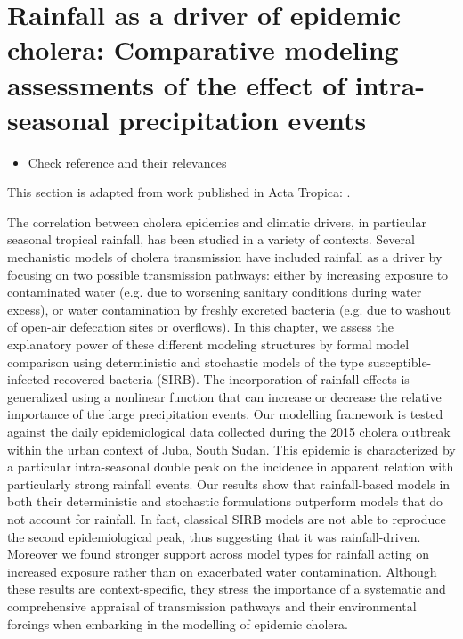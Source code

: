 \chapter{Rainfall as a driver of epidemic cholera: Comparative modeling assessments of the effect of intra-seasonal precipitation events}\label{ch:cholera-rainfall}

\begin{itemize}
	\item Check reference and their relevances
\end{itemize}

This section is adapted from work published in Acta Tropica:
.


The correlation between cholera epidemics and climatic drivers, in particular seasonal tropical rainfall, has been studied in a variety of contexts. Several mechanistic models of cholera transmission have included rainfall as a driver by focusing on two possible transmission pathways: either by increasing exposure to contaminated water (e.g. due to worsening sanitary conditions during water excess), or water contamination by freshly excreted bacteria (e.g. due to washout of open-air defecation sites or overflows). In this chapter, we assess the explanatory power of these different modeling structures by formal model comparison using deterministic and stochastic models of the type susceptible-infected-recovered-bacteria (SIRB). The incorporation of rainfall effects is generalized using a nonlinear function that can increase or decrease the relative importance of the large precipitation events. Our modelling framework is tested against the daily epidemiological data collected during the 2015 cholera outbreak within the urban context of Juba, South Sudan. This epidemic is characterized by a particular intra-seasonal double peak on the incidence in apparent relation with particularly strong rainfall events. Our results show that rainfall-based models in both their deterministic and stochastic formulations outperform models that do not account for rainfall. In fact, classical SIRB models are not able to reproduce the second epidemiological peak, thus suggesting that it was rainfall-driven. Moreover we found stronger support across model types for rainfall acting on increased exposure rather than on exacerbated water contamination. Although these results are context-specific, they stress the importance of a systematic and comprehensive appraisal of transmission pathways and their environmental forcings when embarking in the modelling of epidemic cholera.


